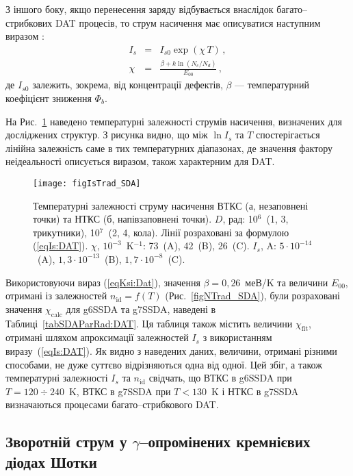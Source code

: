 З іншого боку,  якщо перенесення заряду відбувається внаслідок багато--стрибкових DAT процесів, то струм насичення має описуватися наступним виразом \cite{Evstropov}:
\begin{eqnarray}
  I_s&=&I_{s0}\exp(\chi\,T) \label{eqIs:DAT}\,,\\
   \chi&=&\frac{\beta+k\ln(N_c/N_d)}{E_{00}}\,, \label{eqKsi:Dat}
\end{eqnarray}
де
$I_{s0}$ залежить, зокрема, від концентрації дефектів,
$\beta$ --- температурний коефіцієнт зниження $\Phi_b$.

На Рис.~\ref{figIsTrad_SDA} наведено температурні залежності струмів насичення, визначених для досліджених структур.
З рисунка видно, що між $\ln I_s$ та $T$ спостерігається лінійна залежність саме в тих температурних діапазонах,
де значення фактору неідеальності описується виразом, також характерним для DAT.


\begin{figure}
\center
\texttt{[image: figIsTrad\_SDA]}
\caption{\label{figIsTrad_SDA}
Температурні залежності струму насичення ВТКС (а, незаповнені точки)
та НТКС (б, напівзаповнені точки).
$D$, рад: 10$^6$~(1, 3, трикутники), 10$^7$~(2, 4, кола).
Лінії розраховані за формулою (\ref{eqIs:DAT}).
$\chi$, $10^{-3}$~K$^{-1}$: 73~(A), 42~(B), 26~(C).
$I_s$, A: $5\cdot10^{-14}$~(A),
$1,3\cdot10^{-13}$~(B),
$1,7\cdot10^{-8}$~(C).
}%
\end{figure}

Використовуючи вираз (\ref{eqKsi:Dat}), значення $\beta=0,26$~меВ/K \cite{Aboelfotoh, Evstropov} та величини $E_{00}$,
отримані із залежностей $n_\mathrm{id}=f(T)$ (Рис.~\ref{figNTrad_SDA}),
були розраховані значення $\chi_\mathrm{calc}$ для g6SSDA та g7SSDA, наведені в Таблиці~\ref{tabSDAParRad:DAT}.
Ця таблиця також містить величини $\chi_\mathrm{fit}$, отримані шляхом апроксимації залежностей $I_s$ з використанням виразу~(\ref{eqIs:DAT}).
Як видно з наведених даних, величини, отримані різними способами, не дуже суттєво відрізняються одна від одної.
Цей збіг, а також температурні залежності $I_s$ та $n_\mathrm{id}$ свідчать,
що ВТКС в g6SSDA при $T=120\div240$~K, ВТКС в g7SSDA при $T<130$~K і НТКС в g7SSDA визначаються процесами багато--стрибкового DAT.






\subsection{Зворотній струм у $\gamma$--опромінених кремнієвих діодах Шотки}


